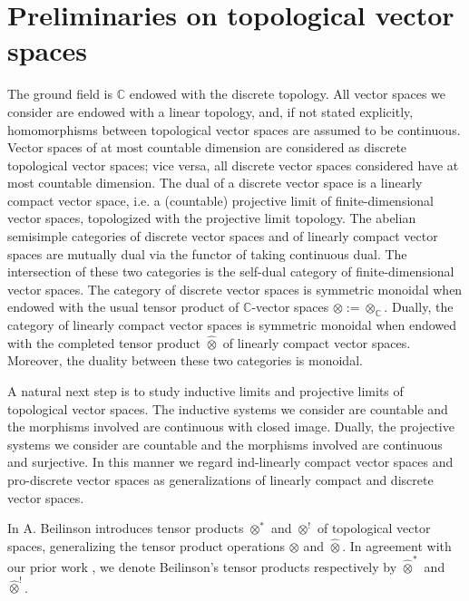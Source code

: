 \documentclass[12pt,reqno]{amsart}
\theoremstyle{definition}
\theoremstyle{remark}
\begin{document}
	

	
	\section{Preliminaries on topological vector spaces}
	
	The ground field is $\mathbb{C}$ endowed with the discrete topology. All vector spaces we consider are endowed with a linear topology, and, if not stated explicitly, homomorphisms between topological vector spaces are assumed to be continuous. 
	Vector spaces of at most countable dimension are considered as discrete topological vector spaces; vice versa, all discrete vector spaces considered have at most countable dimension. 
	The dual of a discrete vector space is a linearly compact vector space, i.e. a (countable) projective limit of finite-dimensional vector spaces, topologized with the projective limit topology. The abelian semisimple categories of discrete vector spaces and of linearly compact vector spaces are mutually dual via the functor of taking continuous dual. The intersection of these two categories is the self-dual category of finite-dimensional vector spaces. 
 The category of discrete vector spaces is symmetric monoidal when endowed with the usual tensor product of $\mathbb{C}$-vector spaces $\otimes := \otimes_{\mathbb{C}}$. Dually, the category of linearly compact vector spaces is symmetric monoidal when endowed with the completed tensor product $\widehat{\otimes}$ of linearly compact vector spaces. Moreover, the duality between these two categories is monoidal.
	
	A natural next step is to study inductive limits and projective limits of topological vector spaces. The inductive systems we consider are countable and the morphisms involved are continuous with closed image. Dually, the projective systems we consider are countable and the morphisms involved are continuous and surjective. In this manner we regard ind-linearly compact vector spaces and pro-discrete vector spaces as generalizations of linearly compact and discrete vector spaces. 
 
    In \cite{Bei} A. Beilinson introduces tensor products $\otimes^\ast $ and $\otimes^! $ of topological vector spaces, generalizing the tensor product operations $\otimes$ and $\widehat{\otimes}$.
    In agreement with our prior work \cite{EP}, we denote Beilinson's tensor products respectively by $\widehat{\otimes}^\ast $ and $\widehat{\otimes}^!$.
\end{document}
